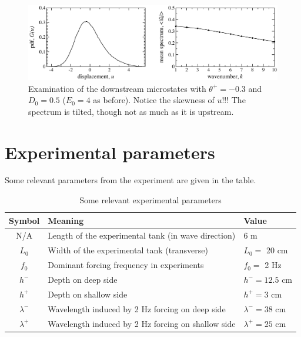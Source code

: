 \documentclass[12pt]{article}
\newcommand{\lamm}{\lambda^{-}}
\newcommand{\lamp}{\lambda^{+}}
\newcommand{\hm}{h^{-}}
\newcommand{\hp}{h^{+}}
\begin{document}
\begin{figure}[p]%
\begin{center}
\includegraphics[width = 0.8 \textwidth]{microdn3}
\caption{Examination of the downstream microstates with $\theta^+ = -0.3$ and $D_0 = 0.5$ ($E_0 = 4$ as before). Notice the skewness of $u$!!! The spectrum is tilted, though not as much as it is upstream.}
\label{microdn3}
\end{center}
\end{figure}
 
 
\newpage
\newpage
\section{Experimental parameters}

Some relevant parameters from the experiment are given in the table.

\begin{table}%
\begin{center}
\caption{Some relevant experimental parameters} 
\vspace{0.3 pc}
\begin{tabular}{c l l}
\hline
\hspace{0.5pc} Symbol
\hspace{0.5pc} & Meaning 
\hspace{0.5pc} & Value \\
\hline
N/A		& Length of the experimental tank (in wave direction)	& 6 m	\\
$L_0$	& Width of the experimental tank	 (transverse)		& $L_0 = $ 20 cm	\\
$f_0$	& Dominant forcing frequency in experiments	& $f_0 = $ 2 Hz	\\
$\hm$	& Depth on deep side						& $\hm = 12.5$ cm \\
$\hp$	& Depth on shallow side					& $\hp = 3$ cm \\
$\lamm$	& Wavelength induced by 2 Hz forcing on deep side	& $\lamm = 38$ cm	\\
$\lamp$	& Wavelength induced by 2 Hz forcing on shallow side	& $\lamp = 25$ cm	\\
\hline
\end{tabular}
\end{center}
\end{table}
 
\end{document}
